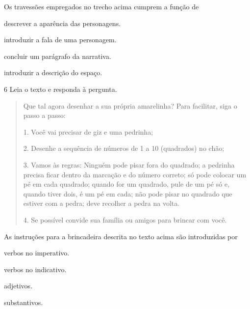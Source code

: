 
Os travessões empregados no trecho acima cumprem a função de

\begin{escolha}
  \item descrever a aparência das personagens.

  \item introduzir a fala de uma personagem.

  \item concluir um parágrafo da narrativa.

  \item introduzir a descrição do espaço.
\end{escolha}

\num{6} Leia o texto e responda à pergunta.

\begin{quote}
Que tal agora desenhar a sua própria amarelinha? Para facilitar, siga o
passo a passo:

1. Você vai precisar de giz e uma pedrinha;

2. Desenhe a sequência de números de 1 a 10 (quadrados) no chão;

3. Vamos às regras: Ninguém pode pisar fora do quadrado; a pedrinha
precisa ficar dentro da marcação e do número correto; só pode colocar um
pé em cada quadrado; quando for um quadrado, pule de um pé só e, quando
tiver dois, é um pé em cada; não pode pisar no quadrado que estiver com a
pedra; deve recolher a pedra na volta.

4. Se possível convide sua família ou amigos para brincar com você.
\end{quote}


As instruções para a brincadeira descrita no texto acima são
introduzidas por

\begin{escolha}
  \item verbos no imperativo.

  \item verbos no indicativo.

  \item adjetivos.

  \item substantivos.
\end{escolha}




